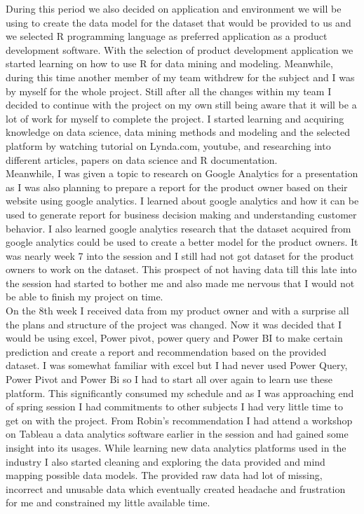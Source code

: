 \documentclass{article}
\begin{document}
During this period we also decided on application and environment we will be using to create the data model for the dataset that would be provided to us and we selected R programming language as preferred application as a product development software. With the selection of product development application we started learning on how to use R for data mining and modeling. Meanwhile, during this time another member of my team withdrew for the subject and I was by myself for the whole project. Still after all the changes within my team I decided to continue with the project on my own still being aware that it will be a lot of work for myself to complete the project. I started learning and acquiring knowledge on data science, data mining methods and modeling and the selected platform by watching tutorial on Lynda.com, youtube, and researching into different articles, papers on data science and R documentation.\\

Meanwhile, I was given a topic to research on Google Analytics for a presentation as I was also planning to prepare a report for the product owner based on their website using google analytics. I learned about google analytics and how it can be used to generate report for business decision making and understanding customer behavior. I also learned google analytics research that the dataset acquired from google analytics could be used to create a better model for the product owners. It was nearly week 7 into the session and I still had not got dataset for the product owners to work on the dataset. This prospect of not having data till this late into the session had started to bother me and also made me nervous that I would not be able to finish my project on time.\\

On the 8th week I received data from my product owner and with a surprise all the plans and structure of the project was changed. Now it was decided that I would be using excel, Power pivot, power query and Power BI to make certain prediction and create a report and recommendation based on the provided dataset. I was somewhat familiar with excel but I had never used Power Query, Power Pivot and Power Bi so I had to start all over again to learn use these platform. This significantly consumed my schedule and as I was approaching end of spring session I had commitments to other subjects I had very little time to get on with the project. From Robin’s recommendation I had attend a workshop on Tableau a data analytics software earlier in the session and had gained some insight into its usages. While learning new data analytics platforms used in the industry I also started cleaning and exploring the data provided and mind mapping possible data models. The provided raw data had lot of missing, incorrect and unusable data which eventually created headache and frustration for me and constrained my little available time.\\
\end{document}
